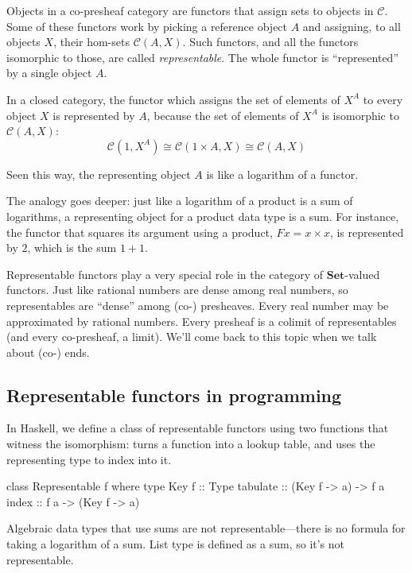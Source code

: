 \documentclass[DaoFP]{subfiles}
\begin{document}
Objects in a  co-presheaf category are functors that assign sets to objects in $\mathcal{C}$. Some of these functors work by picking a reference object $A$ and assigning,  to all objects $X$, their hom-sets  $\mathcal{C}(A, X)$. Such functors, and all the functors isomorphic to those, are called \emph{representable}. The whole functor is ``represented'' by a single object $A$. 

In a closed category, the functor which assigns the set of elements of $X^A$ to every object $X$ is represented by $A$, because the set of elements of $X^A$ is isomorphic to $\mathcal{C}(A, X)$:
\[\mathcal{C}(1, X^A) \cong \mathcal{C}(1 \times A, X) \cong \mathcal{C} (A, X)\]

Seen this way, the representing object $A$ is like a logarithm of a functor. 

The analogy goes deeper: just like a logarithm of a product is a sum of logarithms, a representing object for a product data type is a sum. For instance, the functor that squares its argument using a product, $F x = x \times x$, is represented by $2$, which is the sum $1 + 1$. 

Representable functors play a very special role in the category of $ \mathbf{Set}$-valued functors. Just like rational numbers are dense among real numbers, so representables are ``dense'' among (co-) presheaves. Every real number may be approximated by rational numbers. Every presheaf is a colimit of representables (and every co-presheaf, a limit). We'll come back to this topic when we talk about (co-) ends.

\subsection{Representable functors in programming}

In Haskell, we define a class of representable functors using two functions that witness the isomorphism:  turns a function into a lookup table, and  uses the representing type  to index into it.

\begin{haskell}
class Representable f where
  type Key f :: Type
  tabulate :: (Key f -> a) -> f a
  index    :: f a -> (Key f -> a)
\end{haskell}

Algebraic data types that use sums are not representable---there is no formula for taking a logarithm of a sum. List type is defined as a sum, so it's not representable. 
\end{document}
